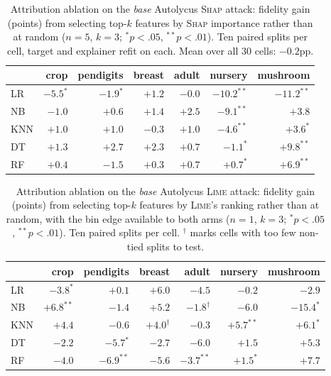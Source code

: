 \documentclass[sigconf,anonymous,review]{acmart}
\begin{document}
\begin{table}[t]
\centering
\caption{Attribution ablation on the \emph{base} Autolycus \textsc{Shap} attack: fidelity gain
(points) from selecting top-$k$ features by \textsc{Shap} importance rather than at random ($n{=}5$,
$k{=}3$; $^{*}p{<}.05$, $^{**}p{<}.01$). Ten paired splits per cell, target and explainer refit on
each. Mean over all $30$ cells: $-0.2$pp.}
\label{tab:shap-attr}
\begin{tabular}{lrrrrrr}
\toprule
 & crop & pendigits & breast & adult & nursery & mushroom \\
\midrule
LR  & $-5.5^{*}$ & $-1.9^{*}$  & $+1.2$ & $-0.0$ & $-10.2^{**}$ & $-11.2^{**}$ \\
NB  & $-1.0$     & $+0.6$      & $+1.4$ & $+2.5$ & $-9.1^{**}$  & $+3.8$ \\
KNN & $+1.0$     & $+1.0$      & $-0.3$ & $+1.0$ & $-4.6^{**}$  & $+3.6^{*}$ \\
DT  & $+1.3$     & $+2.7$      & $+2.3$ & $+0.7$ & $-1.1^{*}$   & $+9.8^{**}$ \\
RF  & $+0.4$     & $-1.5$      & $+0.3$ & $+0.7$ & $+0.7^{*}$   & $+6.9^{**}$ \\
\bottomrule
\end{tabular}
\end{table}

\begin{table}[t]
\centering
\caption{Attribution ablation on the \emph{base} Autolycus \textsc{Lime} attack: fidelity gain (points) from selecting top-$k$
features by \textsc{Lime}'s ranking rather than at random, with the bin edge available to both arms
($n{=}1$, $k{=}3$; $^{*}p{<}.05$, $^{**}p{<}.01$). Ten paired splits per cell. $^{\dag}$ marks cells
with too few non-tied splits to test.}
\label{tab:lime-attr}
\begin{tabular}{lrrrrrr}
\toprule
 & crop & pendigits & breast & adult & nursery & mushroom \\
\midrule
LR  & $-3.8^{*}$  & $+0.1$        & $+6.0$        & $-4.5$        & $-0.2$       & $-2.9$ \\
NB  & $+6.8^{**}$ & $-1.4$        & $+5.2$        & $-1.8^{\dag}$ & $-6.0$       & $-15.4^{*}$ \\
KNN & $+4.4$      & $-0.6$        & $+4.0^{\dag}$ & $-0.3$        & $+5.7^{**}$  & $+6.1^{*}$ \\
DT  & $-2.2$      & $-5.7^{*}$    & $-2.7$        & $-6.0$        & $+1.5$       & $+5.3$ \\
RF  & $-4.0$      & $-6.9^{**}$   & $-5.6$        & $-3.7^{**}$   & $+1.5^{*}$   & $+7.7$ \\
\bottomrule
\end{tabular}
\end{table}
\end{document}
